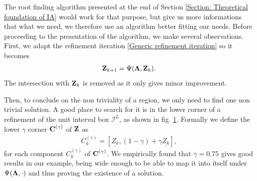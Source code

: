 \documentclass[
11pt, %
english, %
singlespacing, %
nolistspacing, %
liststotoc, %
headsepline, %
]{MastersDoctoralThesis} %
\begin{document}
The root finding algorithm presented at the end of Section \ref{Section: Theoretical foundation of IA} would work for that purpose, but give us more informations that what we need, we therefore use an algorithm better fitting our needs. Before proceeding to the presentation of the algorithm, we make several observations. First, we adapt the refinement iteration \eqref{Generic refinement iteration} so it becomes
\begin{align}
	\boldsymbol{\mathrm{Z}}_{k+1} = \Psi(\boldsymbol{\mathrm{\Lambda}}, \boldsymbol{\mathrm{Z}}_k). \label{Fixpoint refinement}
\end{align}
The intersection with $\boldsymbol{\mathrm{Z}}_k$ is removed as it only gives minor improvement.

Then, to conclude on the non triviality of a region, we only need to find one non trivial solution. A good place to search for it is in the lower corner of a refinement of the unit interval box $\mathcal{I}^L$, as shown in fig. \ref{Figure: Lower corner}. Formally we define the lower $\gamma$ corner $\boldsymbol{\mathrm{C}}^{(\gamma)}$ of $\boldsymbol{\mathrm{Z}}$ as
\begin{align}
	C^{(\gamma)}_k = \left[ \underline{Z_k}, (1 - \gamma) + \gamma \underline{Z_k} \right],
\end{align}
for each component $C^{(\gamma)}_k$ of $\boldsymbol{\mathrm{C}}^{(\gamma)}$. We empirically found that $\gamma = 0.75$ gives good results in our example, being wide enough to be able to map it into itself under $\Psi(\boldsymbol{\mathrm{\Lambda}}, \cdot)$ and thus proving the existence of a solution.

\begin{figure}
	\caption{}
	\label{Figure: Lower corner}
\end{figure}
\end{document}
